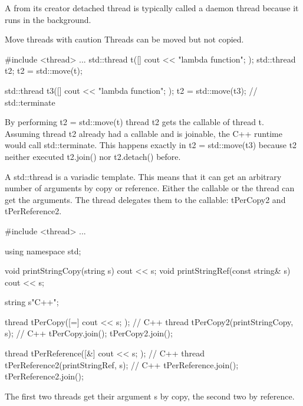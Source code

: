 A from its creator detached thread is typically called a daemon thread because it runs in the background.

\begin{myWarning}{Move threads with caution}
Threads can be moved but not copied.

\begin{cpp}
#include <thread>
...
std::thread t([]{ cout << "lambda function"; });
std::thread t2;
t2 = std::move(t);

std::thread t3([]{ cout << "lambda function"; });
t2 = std::move(t3); // std::terminate
\end{cpp}

By performing t2 = std::move(t) thread t2 gets the callable of thread t. Assuming thread t2 already had a callable and is joinable, the C++ runtime would call std::terminate. This happens exactly in t2 = std::move(t3) because t2 neither executed t2.join() nor t2.detach() before.
\end{myWarning}


A std::thread is a variadic template. This means that it can get an arbitrary number of arguments by copy or reference. Either the callable or the thread can get the arguments. The thread delegates them to the callable: tPerCopy2 and tPerReference2.

\begin{cpp}
#include <thread>
...

using namespace std;

void printStringCopy(string s){ cout << s; }
void printStringRef(const string& s){ cout << s; }

string s{"C++"};

thread tPerCopy([=]{ cout << s; }); // C++
thread tPerCopy2(printStringCopy, s); // C++
tPerCopy.join();
tPerCopy2.join();

thread tPerReference([&]{ cout << s; }); // C++
thread tPerReference2(printStringRef, s); // C++
tPerReference.join();
tPerReference2.join();
\end{cpp}

The first two threads get their argument s by copy, the second two by reference.

